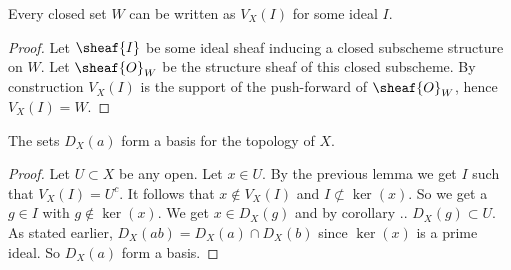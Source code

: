 \begin{lemma}
Every closed set $W$ can be written as $V_X(I)$ for some ideal $I$.
\end{lemma}
\begin{proof}
Let $\sheaf{I}$ be some ideal sheaf inducing a closed subscheme structure on $W$.
Let $\sheaf{O}_W$ be the structure sheaf of this closed subscheme.
By construction $V_X(I)$ is the support of the push-forward of $\sheaf{O}_W$, hence $V_X(I) = W$.
\end{proof}

\begin{lemma}
The sets $D_X(a)$ form a basis for the topology of $X$.
\end{lemma}
\begin{proof}
Let $U\subset X$ be any open. Let $x\in U$.
By the previous lemma we get $I$ such that $V_X(I)=U^c$.
It follows that $x\not\in V_X(I)$ and $I\not\subset \ker(x)$.
So we get a $g\in I$ with $g\not\in \ker(x)$.
We get $x\in D_X(g)$ and by corollary .. $D_X(g)\subset U$.
As stated earlier, $D_X(ab) = D_X(a) \cap D_X(b)$ since $\ker(x)$ is a prime ideal.
So $D_X(a)$ form a basis.
\end{proof}


